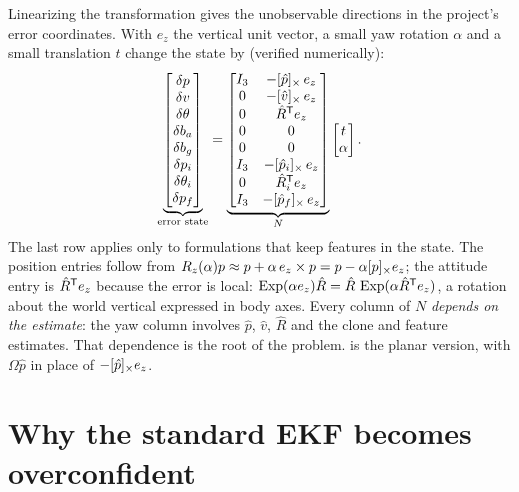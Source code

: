 Linearizing the transformation gives the unobservable directions in the project's error coordinates. With $e_z$ the vertical
unit vector, a small yaw rotation $\alpha$ and a small translation $t$ change the state by (verified numerically):
\begin{equation}
  \underbrace{\begin{bmatrix} \delta p \\ \delta v \\ \delta\theta \\ \delta b_a \\ \delta b_g \\ \delta p_i \\ \delta\theta_i \\ \delta p_f \end{bmatrix}}_{\text{error state}}
  = \underbrace{\begin{bmatrix}
    I_3 & -[\hat p]_{\times}\,e_z \\
    0 & -[\hat v]_{\times}\,e_z \\
    0 & \hat R^{\mathsf{T}} e_z \\
    0 & 0 \\
    0 & 0 \\
    I_3 & -[\hat p_i]_{\times}\,e_z \\
    0 & \hat R_i^{\mathsf{T}} e_z \\
    I_3 & -[\hat p_f]_{\times}\,e_z
  \end{bmatrix}}_{N}
  \begin{bmatrix} t \\ \alpha \end{bmatrix}.
  \label{eq:nullspace-N}
\end{equation}
The last row applies only to formulations that keep features in the state. The position entries follow from
$R_z(\alpha)p \approx p + \alpha\,e_z\times p = p - \alpha[p]_{\times}e_z$; the attitude entry is $\hat R^{\mathsf{T}} e_z$ because the error is
local: $\operatorname{Exp}(\alpha e_z)\hat R = \hat R\,\operatorname{Exp}(\alpha\hat R^{\mathsf{T}} e_z)$, a rotation about the world vertical expressed in body axes. Every column of $N$ \emph{depends on
the estimate}: the yaw column involves $\hat p$, $\hat v$, $\hat R$ and the clone and feature estimates. That dependence is the root of the problem.
 is the planar version, with $\Omega\hat p$ in place of $-[\hat p]_{\times}e_z$.

\section{Why the standard EKF becomes overconfident}


